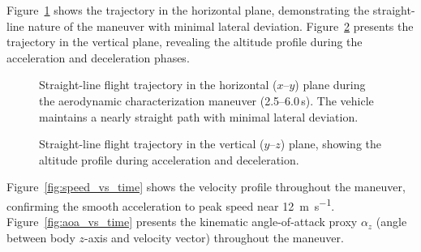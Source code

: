 Figure~\ref{fig:straight_line_trajectory_xy} shows the trajectory in the horizontal plane, demonstrating the straight-line nature of the maneuver with minimal lateral deviation.
Figure~\ref{fig:straight_line_trajectory_zy} presents the trajectory in the vertical plane, revealing the altitude profile during the acceleration and deceleration phases.

\begin{figure}[htbp]
  \centering
  \caption{Straight-line flight trajectory in the horizontal ($x$--$y$) plane during the aerodynamic characterization maneuver (2.5--6.0\,s). The vehicle maintains a nearly straight path with minimal lateral deviation.}
  \label{fig:straight_line_trajectory_xy}
\end{figure}

\begin{figure}[htbp]
  \centering
  \caption{Straight-line flight trajectory in the vertical ($y$--$z$) plane, showing the altitude profile during acceleration and deceleration.}
  \label{fig:straight_line_trajectory_zy}
\end{figure}

Figure~\ref{fig:speed_vs_time} shows the velocity profile throughout the maneuver, confirming the smooth acceleration to peak speed near \SI{12}{\meter\per\second}.
Figure~\ref{fig:aoa_vs_time} presents the kinematic angle-of-attack proxy $\alpha_z$ (angle between body $z$-axis and velocity vector) throughout the maneuver.

